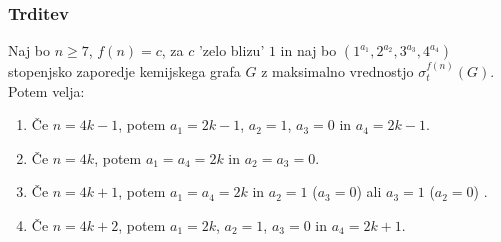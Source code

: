 \documentclass{article}
\begin{document}
\subsubsection*{Trditev}
Naj bo $n \geq 7$, $f(n) = c$, za $c$ 'zelo blizu' $1$ in naj bo $(1^{a_1}, 2^{a_2}, 3^{a_3}, 4^{a_4})$
stopenjsko zaporedje kemijskega grafa $G$ z maksimalno vrednostjo $\sigma_t^{f(n)}(G)$. Potem velja:
\begin{enumerate}
    \item Če $n = 4k - 1$, potem $a_1 = 2k - 1$, $a_2 = 1$, $a_3 = 0$ in $a_4 = 2k - 1$.
    \item Če $n = 4k$, potem $a_1 = a_4 = 2k$ in $a_2 = a_3 = 0$.
    \item Če $n = 4k + 1$, potem $a_1 = a_4 = 2k$ in $a_2 = 1$ ($a_3 = 0$) ali $a_3 = 1$ ($a_2 = 0$) .
    \item Če $n = 4k + 2$, potem $a_1 = 2k$, $a_2 = 1$, $a_3 = 0$ in $a_4 = 2k + 1$. 
\end{enumerate}
\end{document}

